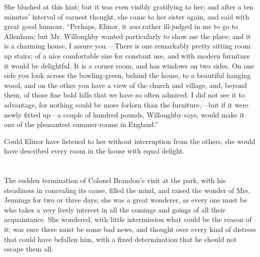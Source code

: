 

She blushed at this hint; but it was even visibly gratifying to her; and after a ten minutes' interval of earnest thought, she came to her sister again, and said with great good humour, “Perhaps, Elinor, it {\em was} rather ill-judged in me to go to Allenham; but Mr. Willoughby wanted particularly to show me the place; and it is a charming house, I assure you.---There is one remarkably pretty sitting room up stairs; of a nice comfortable size for constant use, and with modern furniture it would be delightful. It is a corner room, and has windows on two sides. On one side you look across the bowling-green, behind the house, to a beautiful hanging wood, and on the other you have a view of the church and village, and, beyond them, of those fine bold hills that we have so often admired. I did not see it to advantage, for nothing could be more forlorn than the furniture,---but if it were newly fitted up---a couple of hundred pounds, Willoughby says, would make it one of the pleasantest summer-rooms in England.”

Could Elinor have listened to her without interruption from the others, she would have described every room in the house with equal delight.

\chapter{} %

The sudden termination of Colonel Brandon's visit at the park, with his steadiness in concealing its cause, filled the mind, and raised the wonder of Mrs. Jennings for two or three days; she was a great wonderer, as every one must be who takes a very lively interest in all the comings and goings of all their acquaintance. She wondered, with little intermission what could be the reason of it; was sure there must be some bad news, and thought over every kind of distress that could have befallen him, with a fixed determination that he should not escape them all.

